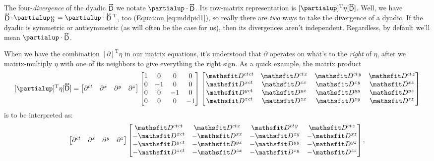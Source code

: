 \documentclass[12pt]{article}
\newcommand{\tightoverset}[2]{%
  \mathop{#2}\limits^{\vbox to -.5ex{\kern-0.75ex\hbox{$#1$}\vss}}}
\newcommand{\inlinedy}[1]{\tightoverset{\text{\tiny$\bm\leftrightarrow$}}{#1}}
\newcommand{\capdy}[1]{ \overset{ \text{\tiny$\bm\leftrightarrow$} }{\vphantom{\text{\small{A}}}\smash{#1}} }
\begin{document}
The four-\emph{divergence} of the dyadic $\inlinedy{\mathsf{D}}$ we notate $\partialup \cdot \inlinedy{\mathsf{D}}$. Its row-matrix representation is $[\partialup]^{\mathrm{T}} \eta [\inlinedy{\mathsf{D}}]$. Well, we have $\inlinedy{\mathsf{D}} \cdot \mkern2mu \partialup_{\inlinedy{\mathsf{D}}} = \partialup \cdot \inlinedy{\mathsf{D}} {}^\mathrm{T}$, too (Equation \ref{eq:mddpid1}), so really there are \emph{two} ways to take the divergence of a dyadic. If the dyadic is symmetric or antisymmetric (as will often be the case for us), then its divergences aren't independent. Regardless, by default we'll mean $\partialup \cdot \inlinedy{\mathsf{D}}$.

When we have the combination $[\partialup]^\mathrm{T} \eta$ in our matrix equations, it's understood that $\partialup$ operates on what's to the \emph{right} of $\eta$, after we matrix-multiply $\eta$ with one of its neighbors to give everything the right sign. As a quick example, the matrix product
\begin{equation*}
\mkern0mu [\partialup]^{\mathrm{T}} \eta [\capdy{\mathsf{D}}]
=
\begin{bmatrix}
\partial^{ct} & \partial^x & \partial^y & \partial^z
\end{bmatrix}
\begin{bmatrix}
1 & 0 & 0 & 0 \\
0 & -1 & 0 & 0 \\
0 & 0 & -1 & 0 \\
0 & 0 & 0 & -1
\end{bmatrix}
\begin{bmatrix}
\mathsfit D^{ct \mkern1.5mu ct} & \mathsfit D^{ct \mkern1.5mu x} & \mathsfit D^{ct \mkern1.5mu y} & \mathsfit D^{ct \mkern1.5mu z} \\
\mathsfit D^{x \mkern1.5mu ct} & \mathsfit D^{x x} & \mathsfit D^{x y} & \mathsfit D^{x z}  \\
\mathsfit D^{y \mkern1.5mu ct} & \mathsfit D^{y x} & \mathsfit D^{y y} & \mathsfit D^{y z}  \\
\mathsfit D^{z \mkern1.5mu ct} & \mathsfit D^{z x} & \mathsfit D^{z y} & \mathsfit D^{z z} 
\end{bmatrix}
\end{equation*}
is to be interpreted as:
\begin{equation*}
\begin{bmatrix}
\partial^{ct} & \partial^x & \partial^y & \partial^z
\end{bmatrix}
\begin{bmatrix}
\mathsfit D^{ct \mkern1.5mu ct} & \mathsfit D^{ct \mkern1.5mu x} & \mathsfit D^{ct \mkern1.5mu y} & \mathsfit D^{ct \mkern1.5mu z} \\
- \mathsfit D^{x \mkern1.5mu ct} & - \mathsfit D^{x x} & - \mathsfit D^{x y} & - \mathsfit D^{x z}  \\
- \mathsfit D^{y \mkern1.5mu ct} & - \mathsfit D^{y x} & - \mathsfit D^{y y} & - \mathsfit D^{y z}  \\
- \mathsfit D^{z \mkern1.5mu ct} & - \mathsfit D^{z x} & - \mathsfit D^{z y} & - \mathsfit D^{z z} 
\end{bmatrix},
\end{equation*}
\end{document}

